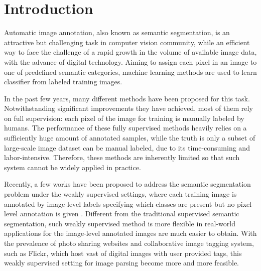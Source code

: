 \section{Introduction}
Automatic image annotation, also known as semantic segmentation, is an attractive but challenging task in computer vision community, while an efficient way to face the challenge of a rapid growth in the volume of available image data, with the advance of digital technology. Aiming to assign each pixel in an image to one of predefined semantic categories, machine learning methods are used to learn classifier from labeled training images.

In the past few years, many different methods \cite{csurka2011efficient,gonfaus2010harmony,ladicky2009associative,nowozin2010parameter,shotton2008semantic,shotton2006textonboost,singh2013nonparametric,verbeek2007scene,yang2007multiple,yao2012describing} have been proposed for this task. Notwithstanding significant improvements they have achieved, most of them rely on full supervision: each pixel of the image for training is manually labeled by humans. The performance of these fully supervised methods heavily relies on a sufficiently huge amount of annotated samples, while the truth is only a subset of large-scale image dataset can be manual labeled, due to its time-consuming and labor-intensive. Therefore, these methods are inherently limited so that such system cannot be widely applied in practice.

Recently, a few works have been proposed to address the semantic segmentation problem under the weakly supervised settings, where each training image is annotated by image-level labels specifying which classes are present but no pixel-level annotation is given \cite{verbeek2007region,vezhnevets2010towards,vezhnevets2011weakly,vezhnevets2012weakly,xu2014tell,zhang2013sparse,zhang2013probabilistic}. Different from the traditional supervised semantic segmentation, such weakly supervised method is more flexible in real-world applications for the image-level annotated images are much easier to obtain. With the prevalence of photo sharing websites and collaborative image tagging system, such as Flickr, which host vast of digital images with user provided tags, this weakly supervised setting for image parsing become more and more feasible.

